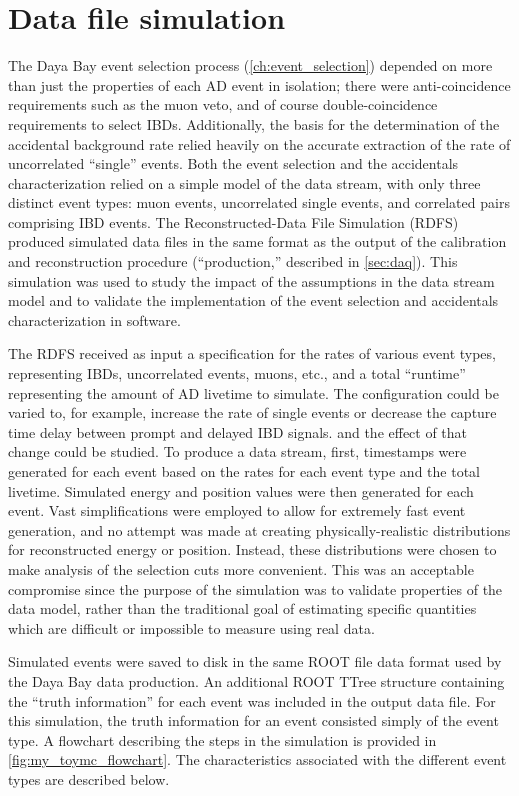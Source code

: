 \section{Data file simulation}
\label{sec:toymc}

The Daya Bay event selection process (\cref{ch:event_selection})
depended on more than just the properties of each AD event in isolation;
there were anti-coincidence requirements such as the muon veto,
and of course double-coincidence requirements to select IBDs.
Additionally, the basis for the determination of the accidental background rate
relied heavily on the accurate extraction of
the rate of uncorrelated ``single'' events.
Both the event selection and the accidentals characterization
relied on a simple model of the data stream,
with only three distinct event types:
muon events, uncorrelated single events,
and correlated pairs comprising IBD events.
The Reconstructed-Data File Simulation (RDFS)
produced simulated data files in the same format
as the output of the calibration and reconstruction procedure
(``production,'' described in \cref{sec:daq}).
This simulation was used
to study the impact of the assumptions in the data stream model
and to validate the implementation of
the event selection and accidentals characterization
in software.

The RDFS received as input
a specification for the rates of various event types,
representing IBDs, uncorrelated events, muons, etc.,
and a total ``runtime'' representing the amount of AD livetime to simulate.
The configuration could be varied to, for example,
increase the rate of single events
or decrease the capture time delay between prompt and delayed IBD signals.
and the effect of that change could be studied.
To produce a data stream,
first, timestamps were generated for each event
based on the rates for each event type and the total livetime.
Simulated energy and position values were then generated for each event.
Vast simplifications were employed to allow for
extremely fast event generation,
and no attempt was made at creating
physically-realistic distributions for
reconstructed energy or position.
Instead, these distributions were chosen to make analysis
of the selection cuts more convenient.
This was an acceptable compromise since the purpose of the simulation
was to validate properties of the data model,
rather than the traditional goal of estimating specific quantities
which are difficult or impossible to measure using real data.

Simulated events were saved to disk in the same ROOT file data format
used by the Daya Bay data production.
An additional ROOT TTree structure containing the ``truth information''
for each event was included in the output data file.
For this simulation, the truth information for an event consisted simply of
the event type.
A flowchart describing the steps in the simulation
is provided in \cref{fig:my_toymc_flowchart}.
The characteristics associated with the different event types
are described below.

